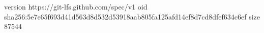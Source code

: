 version https://git-lfs.github.com/spec/v1
oid sha256:5e7e65f693d41d563d8d532d53918aab805fa125afd14ef8d7cd8dfef634c6ef
size 87544
